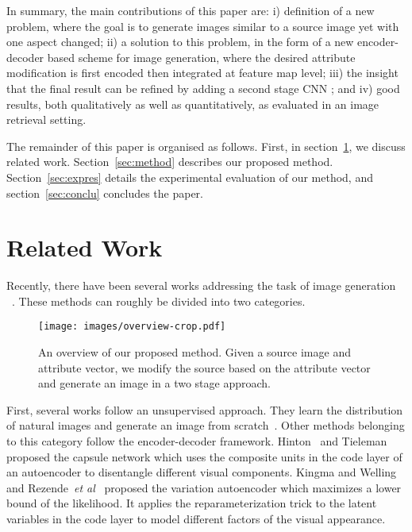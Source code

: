 \documentclass[10pt,twocolumn,letterpaper]{article}
\def\etal{\emph{et al}\onedot}
\begin{document}
In summary, the main contributions of this paper are: i) definition of a new problem, where the goal
is to generate images similar to a source image yet with one aspect changed;
ii) a solution to this problem, %
in the form of a new encoder-decoder based scheme for image generation, where the desired attribute
modification is first encoded then integrated at feature map level;
iii) the insight that the final result can be refined by adding a second stage CNN ;
and iv) good results, both qualitatively as well as quantitatively, as evaluated in an image retrieval setting.

The remainder of this paper is organised as follows.
First, in section~\ref{sec:related}, we discuss related work.
Section~\ref{sec:method} describes our proposed method.
Section~\ref{sec:expres} details the experimental evaluation of our method,
and section~\ref{sec:conclu} concludes the paper.

\vspace{-1mm}
\section{Related Work}
\label{sec:related}
Recently, there have been several works addressing the task of image generation
~\cite{Dosovitskiy-cvpr15, Denton-nips15, Gauthier-14, Goodfellow-nips14, Hinton-icann11, Kingma-iclr14, Kulkarni-nips15, Li-icml15, Rezende-icml14, Tieleman-Thesis, Yang-nips15, Yim-cvpr15, zhu2013deep, zhu-nips14}.
These methods can roughly be divided into two categories.

\begin{figure*}[t]
\begin{center}
    \texttt{[image: images/overview-crop.pdf]}
\end{center}
\caption{An overview of our proposed method. Given a source image and attribute vector, we modify the source based on the attribute vector and generate an image in a two stage approach.}
\label{fig:overview}
\end{figure*}

First, several works follow an unsupervised approach.
They learn the distribution of natural images and generate an image from scratch~\cite{Denton-nips15, Gauthier-14, Goodfellow-nips14, Li-icml15}.
Other methods belonging to this category follow the encoder-decoder framework.
Hinton~\cite{Hinton-icann11} and Tieleman~\cite{Tieleman-Thesis} proposed the capsule network
which uses the composite units in the code layer of an autoencoder to disentangle different visual components.
Kingma and Welling~\cite{Kingma-iclr14} and Rezende~\etal~\cite{Rezende-icml14} proposed the variation autoencoder
which maximizes a lower bound of the likelihood.
It applies the reparameterization trick to the latent variables in the code layer to model different factors of the visual appearance.
\end{document}
